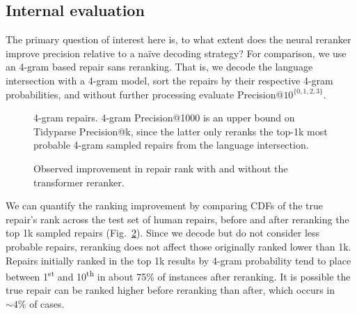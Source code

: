 \documentclass[sigplan,review,acmsmall,nonacm,screen,anonymous]{acmart}\settopmatter{printfolios=false,printccs=false,printacmref=false}
\begin{document}
\clearpage\subsection{Internal evaluation}\label{sec:rq3}

The primary question of interest here is, to what extent does the neural reranker improve precision relative to a na\"ive decoding strategy? For comparison, we use an 4-gram based repair sans reranking. That is, we decode the language intersection with a 4-gram model, sort the repairs by their respective 4-gram probabilities, and without further processing evaluate Precision@$10^{\{0, 1, 2, 3\}}$.\vspace{-0.2cm}
\begin{figure}[H]
\resizebox{.24\textwidth}{!}{}
\resizebox{.24\textwidth}{!}{}
\resizebox{.24\textwidth}{!}{}
\resizebox{.24\textwidth}{!}{}
\caption{4-gram repairs. 4-gram Precision@1000 is an upper bound on Tidyparse Precision@k, since the latter only reranks the top-1k most probable 4-gram sampled repairs from the language intersection.}\label{fig:adaptive}
\end{figure}\vspace{-0.2cm}

\begin{figure}
\vspace{-0.35cm}
%
%
\resizebox{.45\textwidth}{!}{}
\vspace{-0.8cm}
\caption{Observed improvement in repair rank with and without the transformer reranker.}
\label{fig:rank_cdf}
\vspace{-0.3cm}
\end{figure}

We can quantify the ranking improvement by comparing CDFs of the true repair's rank across the test set of human repairs, before and after reranking the top 1k sampled repairs (Fig.~\ref{fig:rank_cdf}). Since we decode but do not consider less probable repairs, reranking does not affect those originally ranked lower than 1k. Repairs initially ranked in the top 1k results by 4-gram probability tend to place between 1\textsuperscript{st} and 10\textsuperscript{th} in about 75\% of instances after reranking. It is possible the true repair can be ranked higher before reranking than after, which occurs in $\sim4\%$ of cases.
\end{document}
